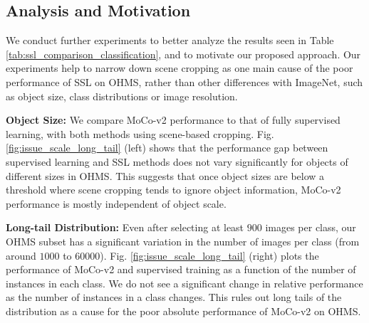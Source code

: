 \subsection{Analysis and Motivation}
We conduct further experiments to better analyze the results seen in Table \ref{tab:ssl_comparison_classification}, and to motivate our proposed approach. Our experiments help to narrow down scene cropping as one main cause of the poor performance of SSL on OHMS, rather than other differences with ImageNet, such as object size, class distributions or image resolution.


\textbf{Object Size:} We compare MoCo-v2 performance to that of fully supervised learning, with both methods using scene-based cropping. Fig. \ref{fig:issue_scale_long_tail} (left) shows that the performance gap between supervised learning and SSL methods does not vary significantly for objects of different sizes in OHMS. This suggests that once object sizes are below a threshold where scene cropping tends to ignore object information, MoCo-v2 performance is mostly independent of object scale. 

\textbf{Long-tail Distribution:} Even after selecting at least $900$ images per class, our OHMS subset has a significant variation in the number of images per class (from around $1000$ to $60000$). Fig. \ref{fig:issue_scale_long_tail} (right) plots the performance of MoCo-v2 and supervised training as a function of the number of instances in each class. We do not see a significant change in relative performance as the number of instances in a class changes. This rules out long tails of the distribution as a cause for the poor absolute performance of MoCo-v2 on OHMS.


